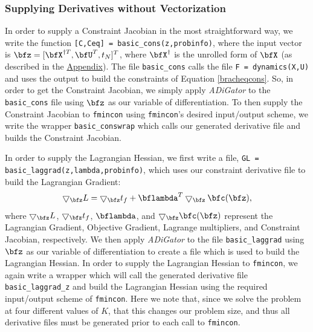 \documentclass[10pt,pdftex]{article}
\begin{document}
\subsubsection*{Supplying Derivatives without Vectorization}
In order to supply a Constraint Jacobian in the most straightforward way, we write the function \texttt{[C,Ceq] = basic\_cons(z,probinfo)}, where the input vector is $\bfz = [\bfX^{\dag T}, \bfU^T,t_N]^T$, where $\bfX^{\dag}$ is the unrolled form of $\bfX$ (as described in the \hyperlink{Appendix}{Appendix}). The file \texttt{basic\_cons} calls the file \texttt{F = dynamics(X,U)} and uses the output to build the constraints of Equation \ref{bracheqcons}. So, in order to get the Constraint Jacobian, we simply apply \emph{ADiGator} to the \texttt{basic\_cons} file using $\bfz$ as our variable of differentiation. To then supply the Constraint Jacobian to \texttt{fmincon} using \texttt{fmincon}'s desired input/output scheme, we write the wrapper \texttt{basic\_conswrap} which calls our generated derivative file and builds the Constraint Jacobian.

In order to supply the Lagrangian Hessian, we first write a file, \texttt{GL = basic\_laggrad(z,lambda,probinfo)}, which uses our constraint derivative file to build the Lagrangian Gradient:
\begin{equation}
\bigtriangledown_{\bfz}L = \bigtriangledown_{\bfz} t_f + \bflambda^T \bigtriangledown_{\bfz}\bfc(\bfz),
\end{equation}
where $\bigtriangledown_{\bfz}L$, $\bigtriangledown_{\bfz} t_f$, $\bflambda$, and $\bigtriangledown_{\bfz}\bfc(\bfz)$ represent the Lagrangian Gradient, Objective Gradient, Lagrange multipliers, and Constraint Jacobian, respectively. We then apply \emph{ADiGator} to the file \texttt{basic\_laggrad} using $\bfz$ as our variable of differentiation to create a file which is used to build the Lagrangian Hessian. In order to supply the Lagrangian Hessian to \texttt{fmincon}, we again write a wrapper which will call the generated derivative file \texttt{basic\_laggrad\_z} and build the Lagrangian Hessian using the required input/output scheme of \texttt{fmincon}. Here we note that, since we solve the problem at four different values of $K$, that this changes our problem size, and thus all derivative files must be generated prior to each call to \texttt{fmincon}.
\end{document}
